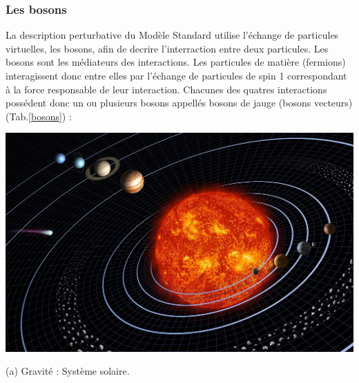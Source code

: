 \subsubsection{Les bosons}
La description perturbative du Modèle Standard utilise l'échange de particules virtuelles, les bosons, afin de decrire l'interraction entre deux particules. Les bosons sont les médiateurs des interactions. Les particules de matière (fermions) interagissent donc entre elles par l'échange de particules de spin 1 correspondant à la force responsable de leur interaction.
\smallskip
Chacunes des quatres interactions possédent donc un ou plusieurs bosons appellés bosons de jauge (bosons vecteurs) (Tab.\ref{bosons}) :
\marginpar
{
\begin{center}
\includegraphics[width=\marginparwidth]{SM/solaire.jpg}
\vspace*{-0.25cm}
\begin{center}\normalfont\small {(a) Gravité : Système solaire.}\end{center}
\vspace*{-0.25cm}

\end{center}}
